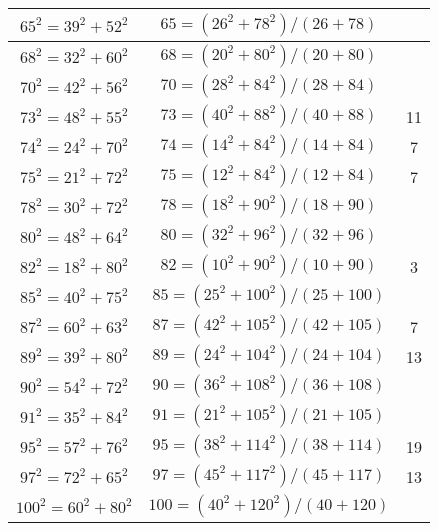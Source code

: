 \documentclass[12pt]{article}
\theoremstyle{definition}
\begin{document}
\begin{center}
\begin{tabular}{|c|c|c|}
\hline
$65^2 = 39^2+52^2$ & $65 = (26^2+78^2)/(26+78)$ & \\
\hline
$68^2 = 32^2+60^2$ & $68 = (20^2+80^2)/(20+80)$ & \\
\hline
$70^2 = 42^2+56^2$ & $70 = (28^2+84^2)/(28+84)$ & \\
\hline
$73^2 = 48^2+55^2$ & $73 = (40^2+88^2)/(40+88)$ & 11\\
\hline
$74^2 = 24^2+70^2$ & $74 = (14^2+84^2)/(14+84)$ & 7\\
\hline
$75^2 = 21^2+72^2$ & $75 = (12^2+84^2)/(12+84)$ & 7\\
\hline
$78^2 = 30^2+72^2$ & $78 = (18^2+90^2)/(18+90)$ & \\
\hline
$80^2 = 48^2+64^2$ & $80 = (32^2+96^2)/(32+96)$ & \\
\hline
$82^2 = 18^2+80^2$ & $82 = (10^2+90^2)/(10+90)$ & 3\\
\hline
$85^2 = 40^2+75^2$ & $85 = (25^2+100^2)/(25+100)$ & \\
\hline
$87^2 = 60^2+63^2$ & $87 = (42^2+105^2)/(42+105)$ & 7\\
\hline
$89^2 = 39^2+80^2$ & $89 = (24^2+104^2)/(24+104)$ & 13\\
\hline
$90^2 = 54^2+72^2$ & $90 = (36^2+108^2)/(36+108)$ & \\
\hline
$91^2 = 35^2+84^2$ & $91 = (21^2+105^2)/(21+105)$ & \\
\hline
$95^2 = 57^2+76^2$ & $95 = (38^2+114^2)/(38+114)$ & 19\\
\hline
$97^2 = 72^2+65^2$ & $97 = (45^2+117^2)/(45+117)$ & 13\\
\hline
$100^2 = 60^2+80^2$ & $100 = (40^2+120^2)/(40+120)$ & \\

\end{tabular}
\end{center}


\end{document}
